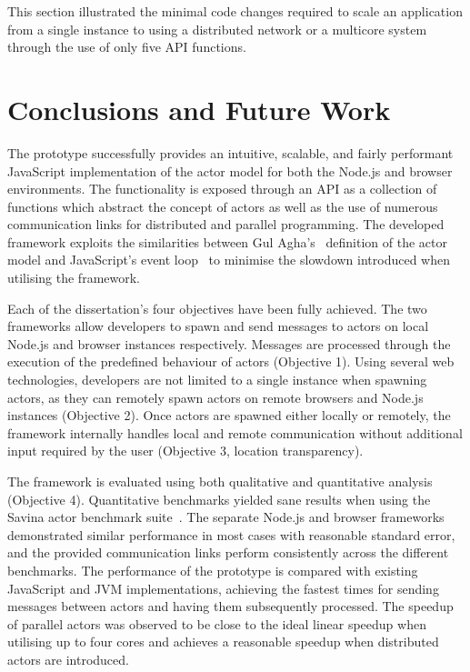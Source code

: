 \documentclass[oneside]{um-fict}
\begin{document}
This section illustrated the minimal code changes required to scale an application from a single instance to using a distributed network or a multicore system through the use of only five API functions.
\chapter{Conclusions and Future Work}\label{chap:conclusions}
The prototype successfully provides an intuitive, scalable, and fairly performant JavaScript implementation of the actor model for both the Node.js and browser environments. The functionality is exposed through an API as a collection of functions which abstract the concept of actors as well as the use of numerous communication links for distributed and parallel programming. The developed framework exploits the similarities between Gul Agha's~\cite{agha1985actors} definition of the actor model and JavaScript's event loop~\cite{eventloopbrowser}\cite{eventloopnode} to minimise the slowdown introduced when utilising the framework. 

Each of the dissertation's four objectives have been fully achieved. The two frameworks allow developers to spawn and send messages to actors on local Node.js and browser instances respectively. Messages are processed through the execution of the predefined behaviour of actors (Objective 1). Using several web technologies, developers are not limited to a single instance when spawning actors, as they can remotely spawn actors on remote browsers and Node.js instances (Objective 2). Once actors are spawned either locally or remotely, the framework internally handles local and remote communication without additional input required by the user (Objective 3, location transparency).

The framework is evaluated using both qualitative and quantitative analysis (Objective 4). Quantitative benchmarks yielded sane results when using the Savina actor benchmark suite~\cite{savina}. The separate Node.js and browser frameworks demonstrated similar performance in most cases with reasonable standard error, and the provided communication links perform consistently across the different benchmarks. The performance of the prototype is compared with existing JavaScript and JVM implementations, achieving the fastest times for sending messages between actors and having them subsequently processed. The speedup of parallel actors was observed to be close to the ideal linear speedup when utilising up to four cores and achieves a reasonable speedup when distributed actors are introduced. 
\end{document}

